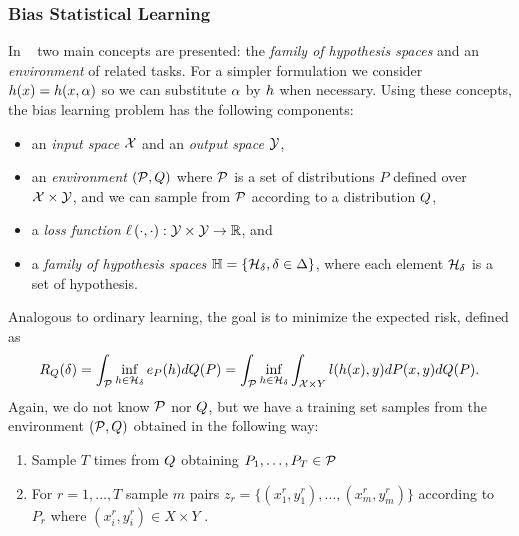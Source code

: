 

\subsubsection*{Bias Statistical Learning}
In ~\cite{baxter2000model} two main concepts are presented: the \emph{family of hypothesis spaces} and an \emph{environment} of related tasks. 
For a simpler formulation we consider $h(x) = h(x, \alpha)$ so we can substitute $\alpha$ by $h$ when necessary.
Using these concepts, the bias learning problem has the following components:
\begin{itemize}\label{eq:biaslearn_exprisk}
    \item an \emph{input space} $\mathcal{X}$ and an \emph{output space} $\mathcal{Y}$,
    \item an \emph{environment} $(\mathcal{P}, Q)$ where $\mathcal{P}$ is a set of distributions $P$ defined over $\mathcal{X} \times \mathcal{Y}$, and we can sample from $\mathcal{P}$ according to a distribution $Q$,
    \item a \emph{loss function} $\ell\left( \cdot, \cdot\right):\mathcal{Y} \times \mathcal{Y} \to \mathbb{R}$, and
    \item a \emph{family of hypothesis spaces} $\mathbb{H} = \left\{\mathcal{H}_\delta, \delta \in \Delta\right\}$, where each element $\mathcal{H}_\delta$ is a set of hypothesis.
\end{itemize}
Analogous to ordinary learning, the goal is to minimize the expected risk, defined as
\begin{equation}\label{}
    \bexprisk(\delta) = \int_{\bprobspace} \inf_{\hypf \in \hypspace_\delta} e_P(h) d\bdistf(P) = \int_{\bprobspace} \inf_{\hypf \in \hypspace_\delta} \int_{\Xspace \times Y} l(h(x), y) dP(x, y) d\bdistf(P).
\end{equation}
Again, we do not know $\mathcal{P}$ nor $Q$, but we have a training set samples from the environment $(\mathcal{P}, Q)$ obtained in the following way:
\begin{enumerate}
    \item Sample $T$ times from $Q$ obtaining $P_1, \ldots, P_T \in \mathcal{P}$
    \item For $r=1, \ldots, T$ sample $m$ pairs $z_r = \{(x_1^r, y_1^r), \ldots, (x_m^r, y_m^r)\}$ according to $P_r$ where $(x_i^r, y_i^r) \in X \times Y$ .
\end{enumerate}
